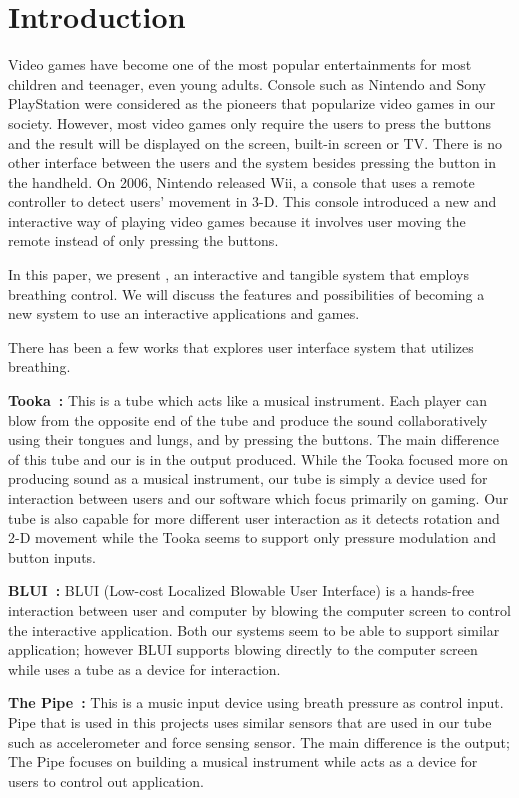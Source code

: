 \section{Introduction}\label{sec:intro}

Video games have become one of the most popular entertainments for most children and teenager, even young adults. Console such as Nintendo and Sony PlayStation were considered as the pioneers that popularize video games in our society. However, most video games only require the users to press the buttons and the result will be displayed on the screen, built-in screen or TV. There is no other interface between the users and the system besides pressing the button in the handheld. On 2006, Nintendo released Wii, a console that uses a remote controller to detect users’ movement in 3-D. This console introduced a new and interactive way of playing video games because it involves user moving the remote instead of only pressing the buttons.

In this paper, we present \tube, an interactive and tangible system that employs breathing control. We will discuss the features and possibilities of \tube becoming a new system to use an interactive applications and games.

There has been a few works that explores user interface system that utilizes breathing.

\textbf{Tooka~\cite{tooka}:} This is a tube which acts like a musical instrument. Each player can blow from the opposite end of the tube and produce the sound collaboratively using their tongues and lungs, and by pressing the buttons. The main difference of this tube and our \tube is in the output produced. While the Tooka focused more on producing sound as a musical instrument, our tube is simply a device used for interaction between users and our software which focus primarily on gaming. Our tube is also capable for more different user interaction as it detects rotation and 2-D movement while the Tooka seems to support only pressure modulation and button inputs.

\textbf{BLUI~\cite{blui}:} BLUI (Low-cost Localized Blowable User Interface) is a hands-free interaction between user and computer by blowing the computer screen to control the interactive application. Both our systems seem to be able to support similar application; however BLUI supports blowing directly to the computer screen while \tube uses a tube as a device for interaction.

\textbf{The Pipe~\cite{thepipe}:} This is a music input device using breath pressure as control input. Pipe that is used in this projects uses similar sensors that are used in our tube such as accelerometer and force sensing sensor. The main difference is the output; The Pipe focuses on building a musical instrument while \tube acts as a device for users to control out application.

